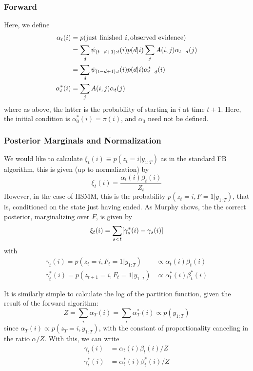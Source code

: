 \documentclass[11pt]{article}
\begin{document}
\subsubsection{Forward}
Here, we define
\begin{align}
    \alpha_t (i) & = p(\text{just finished \emph{i}}, \text{observed evidence}) \\
    &= \sum_d \psi_{(t-d+1):t}(i) p(d|i) \sum_j A(i, j) \alpha_{t - d}(j) \\
    & = \sum_d \psi_{(t-d+1):t}(i) p(d|i) \alpha^*_{t - d}(i) \\
    \alpha^*_t(i) &= \sum_j A(i, j) \alpha_t (j)
\end{align} 
where as above, the latter is the probability of starting in $i$ at time $t + 1$. Here, the initial condition is $\alpha^*_0(i) = \pi(i)$, and $\alpha_0$ need not be defined.

\subsubsection{Posterior Marginals and Normalization}
We would like to calculate $\xi_t(i) \equiv p(z_t = i|y_{1:T})$ as in the standard FB algorithm, this is given (up to normalization) by
\begin{equation}
    \xi_t(i) = \frac{\alpha_t(i) \beta_t(i)}{Z_t}
\end{equation}
However, in the case of HSMM, this is the probability $p(z_t=i, F=1|y_{1:T})$, that is, conditioned on the state just having ended. As Murphy shows, the the correct posterior, marginalizing over $F$, is given by 
\begin{equation}
    \xi_t(i) = \sum_{s < t} [\gamma_s^*(i) - \gamma_s(i)] \\
\end{equation}
with 
\begin{align}
    \gamma_t(i) = p(z_t = i, F_t=1|y_{1:T}) &\propto \alpha_t(i) \beta_t(i) \\
    \gamma^*_t(i) = p(z_{t + 1} = i, F_t=1|y_{1:T}) &\propto \alpha^*_t(i) \beta^*_t(i)
\end{align}

It is similarly simple to calculate the log of the partition function, given the result of the forward algorithm:
\begin{equation}
    Z = \sum_i \alpha_T(i) = \sum_i \alpha^*_T(i) \propto 
    p(y_{1:T})
\end{equation}
since $\alpha_T(i) \propto p(z_T = i, y_{1:T})$, with the constant of proportionality canceling in the ratio $\alpha / Z$. With this, we can write
\begin{align}
    \gamma_t(i) &= \alpha_t(i) \beta_t(i) / Z \\
    \gamma^*_t(i) &= \alpha^*_t(i) \beta^*_t(i) / Z
\end{align}
\end{document}
